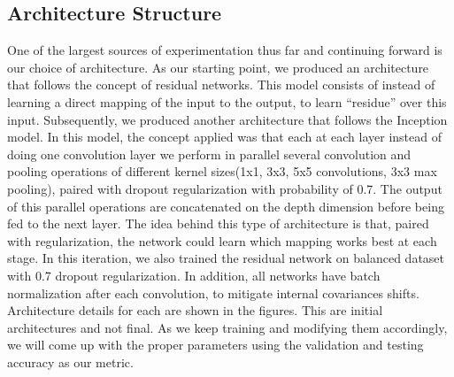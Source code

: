 \documentclass[letterpaper, 10 pt, conference]{../ieeeconf}
\newcommand{\figref}[1]{Fig.~\ref{#1}} %
\begin{document}
\subsection{Architecture Structure}
One of the largest sources of experimentation thus far and continuing forward is our choice of architecture. 
As our starting point, we produced an architecture that follows the concept of residual networks. 
This model consists of instead of learning a direct mapping of the input to the output, to learn ``residue'' over this input. Subsequently, we produced another architecture that follows the Inception model.
In this model, the concept applied was that each at each layer instead of doing one convolution layer we perform in parallel several convolution and pooling operations of different kernel sizes(1x1, 3x3, 5x5 convolutions, 3x3 max pooling), paired with dropout regularization with probability of 0.7.
The output of this parallel operations are concatenated on the depth dimension before being fed to the next layer. The idea behind this type of architecture is that, paired with regularization, the network could learn which mapping works best at each stage. In this iteration, we also trained the residual network
on balanced dataset with 0.7 dropout regularization. In addition, all networks have batch normalization after each convolution, to mitigate internal covariances shifts. Architecture details for each are shown in the figures. This are initial architectures and not final. As we keep training and modifying them accordingly, we will come up with the proper parameters using the validation and testing accuracy as our metric.

{\footnotesize
    
}
\end{document}
